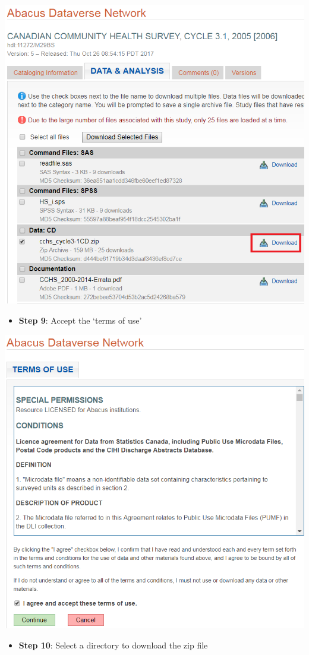 \documentclass[
]{book}
\providecommand{\tightlist}{%
  \setlength{\itemsep}{0pt}\setlength{\parskip}{0pt}}
\begin{document}
\includegraphics[width=0.65\linewidth]{images/abacus8}

\begin{itemize}
\tightlist
\item
  \textbf{Step 9}: Accept the `terms of use'
\end{itemize}

\includegraphics[width=0.65\linewidth]{images/abacus9}

\begin{itemize}
\tightlist
\item
  \textbf{Step 10}: Select a directory to download the zip file
\end{itemize}
\end{document}

